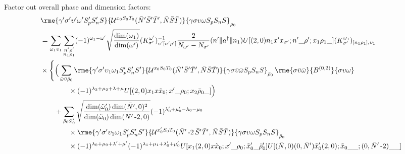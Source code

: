 \documentclass[%
  aps,%
  prc,%
  showpacs,%
  superscriptaddress,%
  onecolumn,%
  notitlepage,%
  11pt,%
  floatfix,%
  amsmath,%
  amssymb,%
]{revtex4-2}
\newcommand{\negative}{\,\text{-}}
\begin{document}
Factor out overall phase and dimension factors:
\begin{align*}
  &
  \rme{\gamma'\sigma'\upsilon'\omega'S_p'S_n'S}{\mathcal{U}^{x_0 S_0 T_0}(\bar{N}'\bar{S}'\bar{T}',\bar{N}\bar{S}\bar{T})}{\gamma\sigma\upsilon\omega S_p S_n S}_{\rho_0}\\
  &=
  \sum_{\omega_1\upsilon_1}
  \sum_{\substack{n'\rho'\\n_1\rho_1}}
  (-1)^{\omega_1-\omega'}
  \sqrt{\frac{\dim(\omega_1)}{\dim(\omega')}}
  (K_{\sigma'}^{\omega'})_{\upsilon'[n'\rho']}^{-1}\frac{2}{N_{\omega'} - N_{\sigma'}}(n'\Vert{}a^\dagger\Vert{}n_1) U[(2,0)n_1 x' x_{\sigma'};n'\_\rho';x_1\rho_1\_](K_{\sigma'}^{\omega_1})_{[n_1\rho_1],\upsilon_1}\\
  &\times\Bigg\{\Big(\sum_{\bar{\omega}\bar{\upsilon}\bar{\rho}_0}
      \rme{\gamma'\sigma'\upsilon_1\omega_1 S_p' S_n' S'}{\mathcal{U}^{x_0S_0T_0}(\bar{N}'\bar{S}'\bar{T}',\bar{N}\bar{S}\bar{T})}{\gamma \sigma \bar{\upsilon}\bar{\omega} S_p S_n S}_{\bar{\rho}_0} \, \rme{\sigma \bar{\upsilon}\bar{\omega}}{B^{(0,2)}}{\sigma \upsilon \omega}\\
  &\qquad\qquad\times
      (-1)^{\lambda_2+\mu_2+\lambda+\mu} U[(2,0) x_1 x \tilde{x}_0; x' \_ \rho_0; x_2\bar{\rho}_0\_]
    \Big)\\
  &\qquad+\sum_{\bar{\rho}_0\tilde{\omega}_0'}
  \sqrt{\frac{\dim(\tilde{\omega}_0')\dim(\bar{N}',0)^2}{\dim(\tilde{\omega}_0)\dim(\bar{N}'\negative2,0)}}
  (-1)^{\lambda_0'+\mu_0'-\lambda_0-\mu_0}
  \\
  & \qquad \qquad \times
  \rme{\gamma'\sigma'\upsilon_1\omega_1 S_p' S_n' S'}{\mathcal{U}^{x_0'S_0T_0}(\bar{N}'\negative2\,\bar{S}'\bar{T}',\bar{N}\bar{S}\bar{T})}{\gamma \sigma \upsilon \omega S_p S_n S}_{\bar{\rho}_0}\\
  &\qquad\qquad\times
      (-1)^{\lambda_0+\mu_0+\lambda'+\mu'}(-1)^{\lambda_1+\mu_1+\lambda_0'+\mu_0'} U[x_1 (2,0) x \tilde{x}_0; x'\_\rho_0;\tilde{x}_0'\_\bar{\rho}_0']
      U[(\bar{N},0) (0,\bar{N}') \tilde{x}_0' (2,0);\tilde{x}_0\_\_;(0,\bar{N}'\negative2)\_\_]\\

\end{align*}
\end{document}
